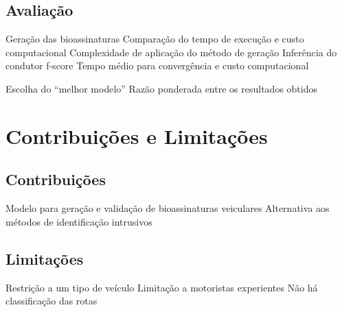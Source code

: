\documentclass[
	12pt,				%
	oneside,			%
	a4paper,			%
	english,			%
	brazil				%
	]{abntex2ppgsi}
\begin{document}
\section{Avaliação}
Geração das bioassinaturas
  Comparação do tempo de execução e custo computacional
  Complexidade de aplicação do método de geração
Inferência do condutor
  f-score
  Tempo médio para convergência e custo computacional

Escolha do “melhor modelo”
  Razão ponderada entre os resultados obtidos
\chapter{Contribuições e Limitações}
\section{Contribuições}
Modelo para geração e validação de bioassinaturas veiculares
Alternativa aos métodos de identificação intrusivos
\section{Limitações}
Restrição a um tipo de veículo
Limitação a motoristas experientes
Não há classificação das rotas

\postextual



%
%

\end{document}
